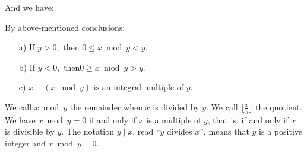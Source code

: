 \documentclass[
	12pt, %
	fleqn, %
	a4paper, %
]{LegrandOrangeBook}
\begin{document}
And we have:
\begin{corollary}
    By above-mentioned conclusions:
    \begin{itemize}
        \item[a)] If $y > 0, \text{ then } 0 \leq x \bmod y < y$.
        \item[b)] If $y < 0, \text{ then}  0 \geq x \bmod y > y$.
        \item[c)]  $x - (x \bmod y) \text{ is an integral multiple of } y$.
    \end{itemize}
\end{corollary}
We call $x \bmod y$ the remainder when $x$ is divided by $y$. We call $\lfloor \frac{x}{y} \rfloor$ the quotient.
We have \( x \bmod y = 0 \) if and only if \( x \) is a multiple of \( y \), that is, if and only if \( x \) is divisible by \( y \). The notation \( y \mid x \), read ``\( y \) divides \( x \)'', means that \( y \) is a positive integer and \( x \bmod y = 0 \).
\end{document}
